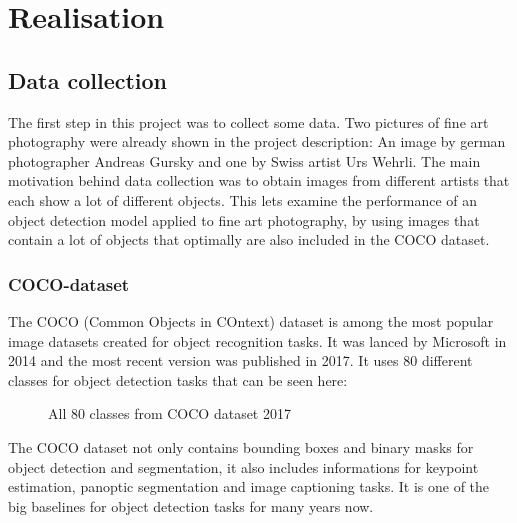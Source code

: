 \chapter{Realisation}

\section{Data collection}

The first step in this project was to collect some data. Two pictures of fine art photography were already shown in the project description: An image by german photographer Andreas Gursky and one by Swiss artist Urs Wehrli. The main motivation behind data collection was to obtain images from different artists that each show a lot of different objects. This lets examine the performance of an object detection model applied to fine art photography, by using images that contain a lot of objects that optimally are also included in the COCO dataset.

\subsection{COCO-dataset}

The COCO (Common Objects in COntext) dataset is among the most popular image datasets created for object recognition tasks. It was lanced by Microsoft in 2014 and the most recent version was published in 2017. It uses 80 different classes for object detection tasks that can be seen here:

\begin{figure}[!h]
	\caption{\label{fig:input-image} All 80 classes from COCO dataset 2017}
\end{figure}

The COCO dataset not only contains bounding boxes and binary masks for object detection and segmentation, it also includes informations for keypoint estimation, panoptic segmentation and image captioning tasks. It is one of the big baselines for object detection tasks for many years now.

